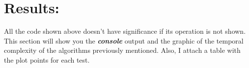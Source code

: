 \section{Results:}

All the code shown above doesn't have significance if its operation is not shown. This section will show you the {\bfseries\itshape console} output and the graphic of the temporal complexity of the algorithms previously mentioned. Also, I attach a table with the plot points for each test.
